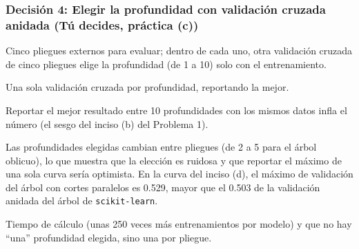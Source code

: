 \documentclass[11pt, letterpaper]{article}
\begin{document}
\subsubsection*{Decisión 4: Elegir la profundidad con validación cruzada anidada (Tú decides, práctica (c))}
\begin{description}[leftmargin=0pt, itemsep=2pt]
    \item[Decisión.] Cinco pliegues externos para evaluar; dentro de cada uno, otra validación cruzada de cinco pliegues elige la profundidad (de 1 a 10) solo con el entrenamiento.
    \item[Alternativa descartada.] Una sola validación cruzada por profundidad, reportando la mejor.
    \item[Por qué.] Reportar el mejor resultado entre 10 profundidades con los mismos datos infla el número (el sesgo del inciso (b) del Problema 1).
    \item[Evidencia.] Las profundidades elegidas cambian entre pliegues (de 2 a 5 para el árbol oblicuo), lo que muestra que la elección es ruidosa y que reportar el máximo de una sola curva sería optimista. En la curva del inciso (d), el máximo de validación del árbol con cortes paralelos es 0.529, mayor que el 0.503 de la validación anidada del árbol de \texttt{scikit-learn}.
    \item[Qué perdemos.] Tiempo de cálculo (unas 250 veces más entrenamientos por modelo) y que no hay ``una'' profundidad elegida, sino una por pliegue.
\end{description}
\end{document}
